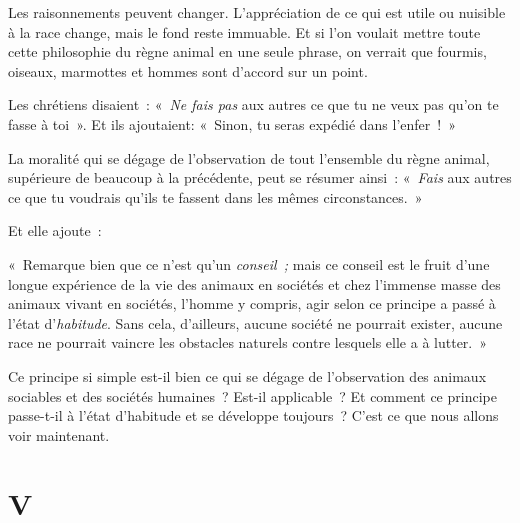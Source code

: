 \documentclass[french,twoside]{book} %
\begin{document}
\bigbreak
\noindent Les raisonnements peuvent changer. L’appréciation de ce qui est utile ou nuisible à la race change, mais le fond reste immuable. Et si l’on voulait mettre toute cette philosophie du règne animal en une seule phrase, on verrait que fourmis, oiseaux, marmottes et hommes sont d’accord sur un point.\par
Les chrétiens disaient : « \emph{Ne fais pas} aux autres ce que tu ne veux pas qu’on te fasse à toi ». Et ils ajoutaient: « Sinon, tu seras expédié dans l’enfer ! »\par
La moralité qui se dégage de l’observation de tout l’ensemble du règne animal, supérieure de beaucoup à la précédente, peut se résumer ainsi : « \emph{Fais} aux autres ce que tu voudrais qu’ils te fassent dans les mêmes circonstances. »\par
Et elle ajoute :\par
« Remarque bien que ce n’est qu’un \emph{conseil ;} mais ce conseil est le fruit d’une longue expérience de la vie des animaux en sociétés et chez l’immense masse des animaux vivant en sociétés, l’homme y compris, agir selon ce principe a passé à l’état d’\emph{habitude}. Sans cela, d’ailleurs, aucune société ne pourrait exister, aucune race ne pourrait vaincre les obstacles naturels contre lesquels elle a à lutter. »\par
\bigbreak
\noindent Ce principe si simple est-il bien ce qui se dégage de l’observation des animaux sociables et des sociétés humaines ? Est-il applicable ? Et comment ce principe passe-t-il à l’état d’habitude et se développe toujours ? C’est ce que nous allons voir maintenant.
\section[{V}]{V}
\label{p05}\renewcommand{\leftmark}{V}
\end{document}
